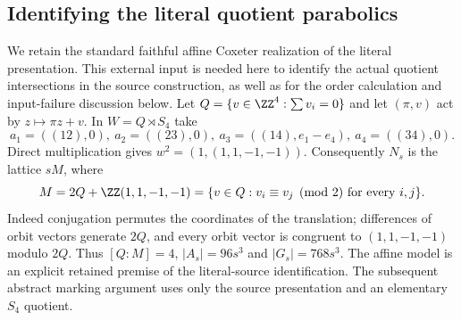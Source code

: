 \subsection{Identifying the literal quotient parabolics}
We retain the standard faithful affine Coxeter realization of the
literal presentation. This external input is needed here to identify
the actual quotient intersections in the source construction, as well
as for the order calculation and input-failure discussion below.
Let $Q=\{v\in\ZZ^4:\sum v_i=0\}$ and let $(\pi,v)$ act by
$z\mapsto\pi z+v$. In $W=Q\rtimes S_4$ take
\[
 a_1=((12),0),\ a_2=((23),0),\ a_3=((14),e_1-e_4),\ a_4=((34),0).
\]
Direct multiplication gives $w^2=(1,(1,1,-1,-1))$.
Consequently $N_s$ is the lattice $sM$, where
\[
 M=2Q+\ZZ(1,1,-1,-1)
  =\{v\in Q:v_i\equiv v_j\pmod2\text{ for every }i,j\}.
\]
Indeed conjugation permutes the coordinates of the translation;
differences of orbit vectors generate $2Q$, and every orbit vector
is congruent to $(1,1,-1,-1)$ modulo $2Q$. Thus $[Q:M]=4$,
$|A_s|=96s^3$ and $|G_s|=768s^3$. The affine model is an explicit retained premise of the literal-source
identification. The subsequent abstract marking argument uses only
the source presentation and an elementary $S_4$ quotient.

